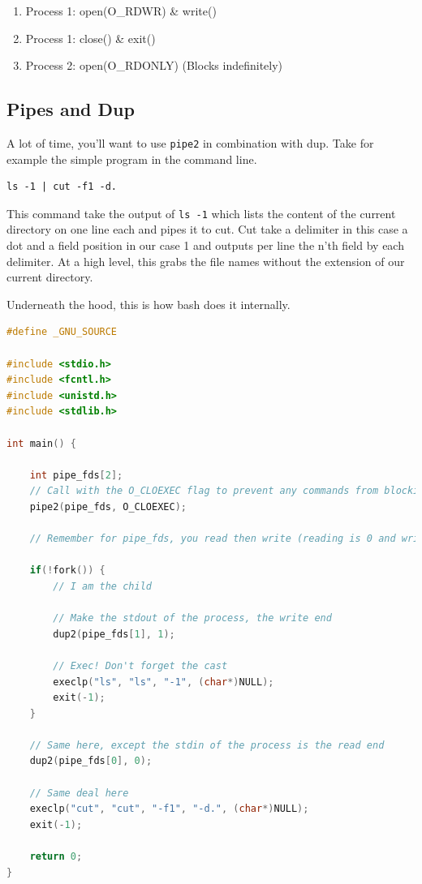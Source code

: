 \begin{enumerate}
\item Process 1: open(O\_RDWR) \& write()
\item Process 1: close() \& exit()
\item Process 2: open(O\_RDONLY) (Blocks indefinitely) 
\end{enumerate}

\subsection{Pipes and Dup}

A lot of time, you'll want to use \texttt{pipe2} in combination with dup. Take for example the simple program in the command line.

\begin{verbatim}
ls -1 | cut -f1 -d.
\end{verbatim}

This command take the output of \texttt{ls -1} which lists the content of the current directory on one line each and pipes it to cut.
Cut take a delimiter in this case a dot and a field position in our case 1 and outputs per line the n'th field by each delimiter.
At a high level, this grabs the file names without the extension of our current directory.

Underneath the hood, this is how bash does it internally.


\begin{lstlisting}[language=C]
#define _GNU_SOURCE

#include <stdio.h>
#include <fcntl.h>
#include <unistd.h>
#include <stdlib.h>

int main() {

    int pipe_fds[2];
    // Call with the O_CLOEXEC flag to prevent any commands from blocking
    pipe2(pipe_fds, O_CLOEXEC);

    // Remember for pipe_fds, you read then write (reading is 0 and writing is 1)

    if(!fork()) {
        // I am the child

        // Make the stdout of the process, the write end
        dup2(pipe_fds[1], 1);

        // Exec! Don't forget the cast
        execlp("ls", "ls", "-1", (char*)NULL);
        exit(-1);
    }

    // Same here, except the stdin of the process is the read end
    dup2(pipe_fds[0], 0);

    // Same deal here
    execlp("cut", "cut", "-f1", "-d.", (char*)NULL);
    exit(-1);

    return 0;
}
\end{lstlisting}

